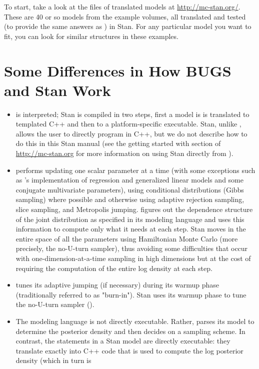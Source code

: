 To start, take a look at the files of translated \BUGS models at
\url{http://mc-stan.org/}.  These are 40 or so models from the \BUGS
example volumes, all translated and tested (to provide the same
answers as \BUGS) in Stan.  For any particular model you want to fit,
you can look for similar structures in these examples.

\section{Some Differences in How BUGS and Stan Work}

\begin{itemize}
\item \BUGS is interpreted; Stan is compiled in two steps, first a
  model is is translated to templated C++ and then to a
  platform-specific executable.  Stan, unlike \BUGS, allows the user
  to directly program in C++, but we do not describe how to do this in
  this Stan manual (see the getting started with \Cpp section of
  \url{http://mc-stan.org} for more information on using Stan directly
  from \Cpp).
\item \BUGS performs \MCMC updating one scalar parameter at a time
  (with some exceptions such as \JAGS's implementation of regression
  and generalized linear models and some conjugate multivariate
  parameters), using conditional distributions (Gibbs sampling) where
  possible and otherwise using adaptive rejection sampling, slice
  sampling, and Metropolis jumping.  \BUGS figures out the dependence
  structure of the joint distribution as specified in its modeling
  language and uses this information to compute only what it needs at
  each step.  Stan moves in the entire space of all the parameters
  using Hamiltonian Monte Carlo (more precisely, the no-U-turn
  sampler), thus avoiding some difficulties that occur with
  one-dimension-at-a-time sampling in high dimensions but at the cost
  of requiring the computation of the entire log density at each step.
\item \BUGS tunes its adaptive jumping (if necessary) during its
  warmup phase (traditionally referred to as "burn-in").  Stan uses
  its warmup phase to tune the no-U-turn sampler (\NUTS).
\item The \BUGS modeling language is not directly executable.  Rather,
  \BUGS parses its model to determine the posterior density and then
  decides on a sampling scheme.  In contrast, the statements in a Stan
  model are directly executable: they translate exactly into C++ code
  that is used to compute the log posterior density (which in turn is

\end{itemize}
